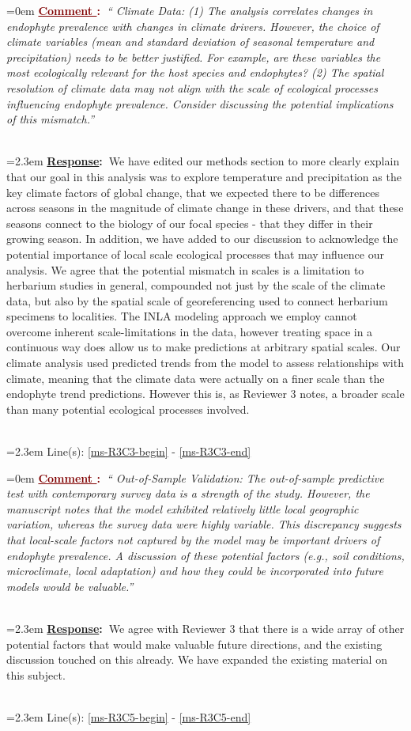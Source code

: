\documentclass[12pt]{article}
\newcounter{cN}
\newcommand{\comment}[1]{
	\vspace{2em}
	\refstepcounter{cN} %
	\noindent \hangindent=0em \textbf{\textcolor{Maroon}{\uline{Comment \thecN}:~}}\emph{``#1''}
	}
\newcommand{\response}[1]{
	\\[0.25em]
	\hangindent=2.3em \textbf{\textcolor{NavyBlue}{\uline{Response}:~}}#1
	}
\newcommand{\linesref}[2]{
		\\[0.25em]
	\hangindent=2.3em {\color{Mahogany} Line(s): \ref{#1} - \ref{#2}}
}
\begin{document}
\comment{  Climate Data: (1) The analysis correlates changes in endophyte prevalence with changes in climate drivers. However, the choice of climate variables (mean and standard deviation of seasonal temperature and precipitation) needs to be better justified. For example, are these variables the most ecologically relevant for the host species and endophytes? (2) The spatial resolution of climate data may not align with the scale of ecological processes influencing endophyte prevalence. Consider discussing the potential implications of this mismatch.}
\response{We have edited our methods section to more clearly explain that our goal in this analysis was to explore temperature and precipitation as the key climate factors of global change, that we expected there to be differences across seasons in the magnitude of climate change in these drivers, and that these seasons connect to the biology of our focal species - that they differ in their growing season. In addition, we have added to our discussion to acknowledge the potential importance of local scale ecological processes that may influence our analysis. We agree that the potential mismatch in scales is a limitation to herbarium studies in general, compounded not just by the scale of the climate data, but also by the spatial scale of georeferencing used to connect herbarium specimens to localities. The INLA modeling approach we employ cannot overcome inherent scale-limitations in the data, however treating space in a continuous way does allow us to make predictions at arbitrary spatial scales. Our climate analysis used predicted trends from the model to assess relationships with climate, meaning that the climate data were actually on a finer scale than the endophyte trend predictions. However this is, as Reviewer 3 notes, a broader scale than many potential ecological processes involved.}
\linesref{ms-R3C3-begin}{ms-R3C3-end}


\comment{ Out-of-Sample Validation: The out-of-sample predictive test with contemporary survey data is a strength of the study. However, the manuscript notes that the model exhibited relatively little local geographic variation, whereas the survey data were highly variable. This discrepancy suggests that local-scale factors not captured by the model may be important drivers of endophyte prevalence. A discussion of these potential factors (e.g., soil conditions, microclimate, local adaptation) and how they could be incorporated into future models would be valuable.}
\response{We agree with Reviewer 3 that there is a wide array of other potential factors that would make valuable future directions, and the existing discussion touched on this already. We have expanded the existing material on this subject.}
\linesref{ms-R3C5-begin}{ms-R3C5-end}
\end{document}
